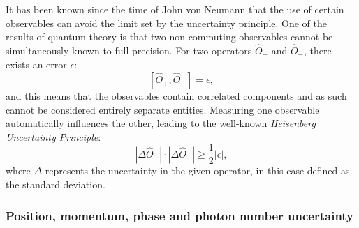 It has been known since the time of John von Neumann  that the use of certain observables can avoid the limit set by the uncertainty principle. One of the results of quantum theory is that two non-commuting observables cannot be simultaneously known to full precision. For two operators $\hat{O}_+$ and $\hat{O}_-$, there exists an error $\epsilon$:
\begin{equation}
 \left[ \hat{O}_+, \hat{O}_- \right] = \epsilon,
\end{equation}
and this means that the observables contain correlated components and as such cannot be considered entirely separate entities. Measuring one observable automatically influences the other, leading to the well-known \emph{Heisenberg Uncertainty Principle}:
\begin{equation}
 \left| \Delta \hat{O}_+ \right| \cdot \left| \Delta \hat{O}_- \right| \geq
\frac{1}{2} \left| \epsilon \right|,
\end{equation}
where $\Delta$ represents the uncertainty in the given operator, in this case defined as the standard deviation.

\subsubsection{\label{sec:operator-uncertainty}Position, momentum, phase and photon number uncertainty}

